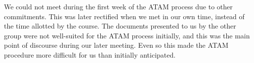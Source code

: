 We could not meet during the first week of the ATAM process due to other commitments.
This was later rectified when we met in our own time, instead of the time allotted by
the course. The documents presented to us by the other group were not well-suited
for the ATAM process initially, and this was the main point of discourse during our
later meeting. Even so this made the ATAM procedure more difficult for us than
initially anticipated.
